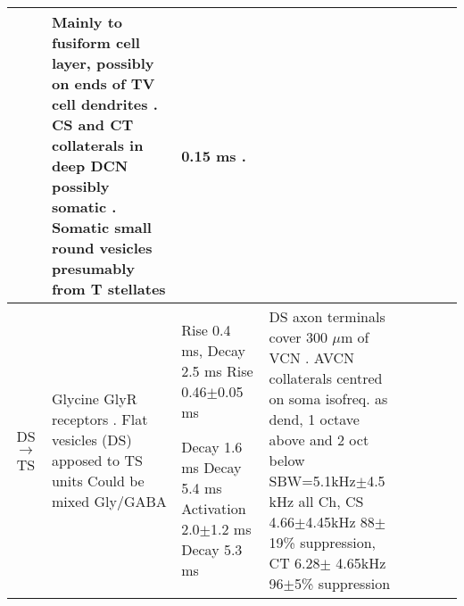 \begin{longtable}{cYYYYYYY}
& %
Mainly to fusiform cell layer, possibly on ends of TV cell dendrites \citep[mouse][]{OertelWuEtAl:1990}. 
CS and CT collaterals in deep DCN possibly somatic \citep[guinea pig][]{PalmerWallaceEtAl:2003}.
Somatic small round vesicles presumably from T stellates  \citep[guinea pig][]{Alibardi:1999}   
& %
0.15 ms \citep[min EPSP latency to VCN Glutamate puffs, main excitation at 0.3 ms, AN shock produces late EPSPs about 3 msec][]{ZhangOertel:1993}.
\\ \midrule
DS\ensuremath{\rightarrow}TS                        
& %
Glycine GlyR receptors \citep[mouse][]{FerragamoGoldingEtAl:1998a}.
Flat vesicles (DS) apposed to TS units \citep[cat][]{SmithRhode:1989}     
Could be mixed Gly/GABA \citep{AltschulerJuizEtAl:1993} 
& %
Rise 0.4 ms, Decay 2.5 ms \citep[spontaneous IPSCs in rat MNTB neurons,][]{AwatramaniTurecekEtAl:2005}
Rise 0.46$\pm$0.05 ms \citep[spontaneous IPSCs in AVCN bushy cells, mouse][]{LimOleskevichEtAl:2003}


Decay 1.6 ms \citep[mouse VCN,]{Oertel:1983}
Decay 5.4 ms \citep{OertelWickesberg:1993,WickesbergOertel:1993}    
Activation 2.0$\pm$1.2 ms Decay 5.3 ms \citep[Gly puffs at 22$^\circ$C (Q$_{10}$ 2.1) in  guinea pig VCN,][]{HartyManis:1998}
& %
DS axon terminals cover 300 $\mu$m of VCN \citep[mouse][]{OertelWuEtAl:1990}.
AVCN collaterals centred on soma isofreq. as dend, 1 octave above and 2 oct below \citep[gerbil][]{ArnottWallaceEtAl:2004} 
SBW=5.1kHz$\pm$4.5 kHz all Ch, CS 4.66$\pm$4.45kHz 88$\pm$19\% suppression, CT 6.28$\pm$ 4.65kHz    96$\pm$5\% suppression \citep{RhodeGreenberg:1994b}
& %
 

\end{longtable}
